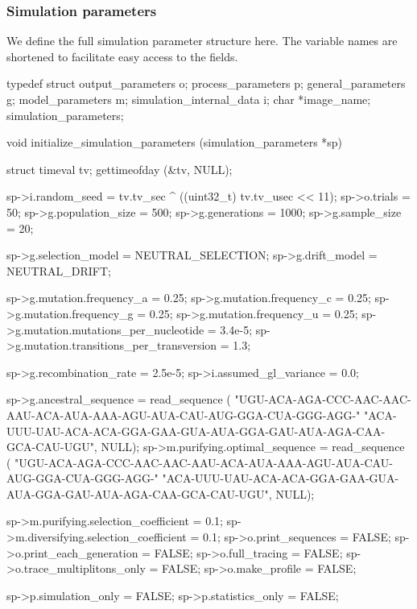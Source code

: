 \documentclass{article}
\begin{document}
      \subsubsection{Simulation parameters}
	\label{sec:simulation-parameter-complete}

	We define the full simulation parameter structure here. The variable
	names are shortened to facilitate easy access to the fields.

\begin{ccode}
typedef struct {
  output_parameters		o;
  process_parameters		p;
  general_parameters		g;
  model_parameters		m;
  simulation_internal_data	i;
  char				*image_name;
} simulation_parameters;

void initialize_simulation_parameters (simulation_parameters *sp) {
  struct timeval tv;
  gettimeofday (&tv, NULL);

  sp->i.random_seed                     	= tv.tv_sec ^ ((uint32_t) tv.tv_usec << 11);
  sp->o.trials                     		= 50;
  sp->g.population_size				= 500;
  sp->g.generations				= 1000;
  sp->g.sample_size				= 20;

  sp->g.selection_model				= NEUTRAL_SELECTION;
  sp->g.drift_model				= NEUTRAL_DRIFT;

  sp->g.mutation.frequency_a			= 0.25;
  sp->g.mutation.frequency_c			= 0.25;
  sp->g.mutation.frequency_g			= 0.25;
  sp->g.mutation.frequency_u			= 0.25;
  sp->g.mutation.mutations_per_nucleotide	= 3.4e-5;
  sp->g.mutation.transitions_per_transversion	= 1.3;

  sp->g.recombination_rate			= 2.5e-5;
  sp->i.assumed_gl_variance			= 0.0;

  sp->g.ancestral_sequence = read_sequence (
    "UGU-ACA-AGA-CCC-AAC-AAC-AAU-ACA-AUA-AAA-AGU-AUA-CAU-AUG-GGA-CUA-GGG-AGG-"
    "ACA-UUU-UAU-ACA-ACA-GGA-GAA-GUA-AUA-GGA-GAU-AUA-AGA-CAA-GCA-CAU-UGU", NULL);
  sp->m.purifying.optimal_sequence = read_sequence (
    "UGU-ACA-AGA-CCC-AAC-AAC-AAU-ACA-AUA-AAA-AGU-AUA-CAU-AUG-GGA-CUA-GGG-AGG-"
    "ACA-UUU-UAU-ACA-ACA-GGA-GAA-GUA-AUA-GGA-GAU-AUA-AGA-CAA-GCA-CAU-UGU", NULL);

  sp->m.purifying.selection_coefficient		= 0.1;
  sp->m.diversifying.selection_coefficient	= 0.1;
  sp->o.print_sequences				= FALSE;
  sp->o.print_each_generation			= FALSE;
  sp->o.full_tracing				= FALSE;
  sp->o.trace_multiplitons_only			= FALSE;
  sp->o.make_profile				= FALSE;

  sp->p.simulation_only				= FALSE;
  sp->p.statistics_only				= FALSE;

}
\end{ccode}
\end{document}

